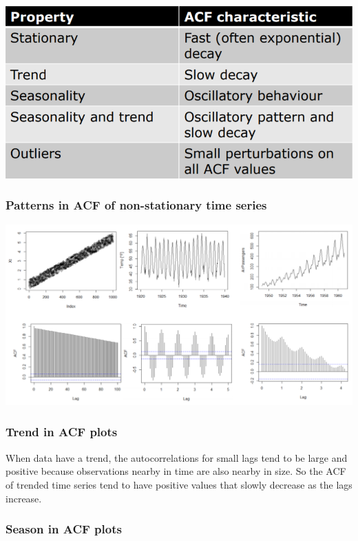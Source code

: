\documentclass[
]{article}
\begin{document}
\includegraphics[width=1\linewidth]{acf}

\hypertarget{patterns-in-acf-of-non-stationary-time-series}{%
\subsubsection{Patterns in ACF of non-stationary time
series}\label{patterns-in-acf-of-non-stationary-time-series}}

\includegraphics[width=1\linewidth]{patt}

\hypertarget{trend-in-acf-plots}{%
\subsubsection{Trend in ACF plots}\label{trend-in-acf-plots}}

When data have a trend, the autocorrelations for small lags tend to be
large and positive because observations nearby in time are also nearby
in size. So the ACF of trended time series tend to have positive values
that slowly decrease as the lags increase.

\hypertarget{season-in-acf-plots}{%
\subsubsection{Season in ACF plots}\label{season-in-acf-plots}}
\end{document}
